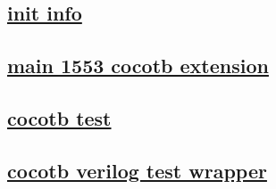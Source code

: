\documentclass{article}
\begin{document}
  


  \subsection{\href{../files/__init__-py.html}{init info}}
  \subsection{\href{../files/mil_std_1553-py.html}{main 1553 cocotb extension}}
  \subsection{\href{../files2/test_mil_std_1553-py.html}{cocotb test}}
  \subsection{\href{../files2/test_mil_std_1553-v.html}{cocotb verilog test wrapper}}
\end{document}
